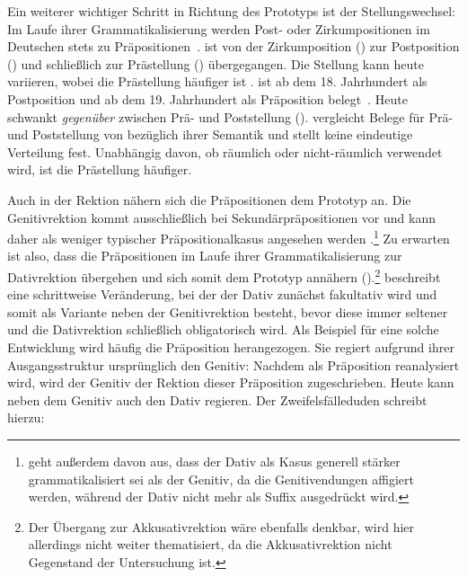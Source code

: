 Ein weiterer wichtiger Schritt in Richtung des Prototyps ist der Stellungswechsel:  
Im Laufe ihrer Grammatikalisierung werden Post- oder Zirkumpositionen im Deutschen stets zu Pr{\"a}positionen~\citep[s.][35]{Lehmann1992}. 
ist von der Zirkumposition () zur Postposition () und schließlich zur Prästellung () übergegangen. 
Die Stellung kann heute variieren, wobei die Prästellung häufiger ist \citep[s.][223]{DiMeola2011}. 
 ist ab dem 18. Jahrhundert als Postposition und ab dem 19. Jahrhundert als Pr{\"a}position belegt~\citep[35]{Lehmann1992}. 
Heute schwankt \textit{gegen{\"u}ber} zwischen Pr{\"a}- und Poststellung (\cites[s.][69--70]{DiMeola2000}[{\S}1431]{Duden2022}). 
\citet[198]{DiMeola2000} vergleicht Belege für Prä- und Poststellung von  bezüglich ihrer Semantik und stellt keine eindeutige Verteilung fest. 
Unabhängig davon, ob  räumlich oder nicht-räumlich verwendet wird, ist die Prästellung häufiger.

Auch in der Rektion nähern sich die Präpositionen dem Prototyp an. 
Die Genitivrektion kommt ausschließlich bei Sekundärpräpositionen vor und kann daher als weniger typischer Präpositionalkasus angesehen werden \citep[s.][32--34]{Lindqvist1994}.\footnote{\citet[303]{Lehmann.1985} geht außerdem davon aus, dass der Dativ als Kasus generell st{\"a}rker grammatikalisiert sei als der Genitiv, da die Genitivendungen affigiert werden, w{\"a}hrend der Dativ nicht mehr als Suffix ausgedr{\"u}ckt wird.}
Zu erwarten ist also, dass die Präpositionen im Laufe ihrer Grammatikalisierung zur Dativrektion übergehen und sich somit dem Prototyp annähern (\cites[s.][38]{Lehmann1992}[95]{Szczepaniak2011}).\footnote{Der Übergang zur Akkusativrektion wäre ebenfalls denkbar, wird hier allerdings nicht weiter thematisiert, da die Akkusativrektion nicht Gegenstand der Untersuchung ist.} 
\citet[38--39]{Lindqvist1994} beschreibt eine schrittweise Ver{\"a}nderung, bei der der Dativ zun{\"a}chst fakultativ wird und somit als Variante neben der Genitivrektion besteht, bevor diese immer seltener und die Dativrektion schlie{\ss}lich obligatorisch wird.
Als Beispiel für eine solche Entwicklung wird häufig die Präposition herangezogen. 
Sie regiert aufgrund ihrer Ausgangsstruktur ursprünglich den Genitiv: Nachdem  als Präposition reanalysiert wird, wird der Genitiv der Rektion dieser Präposition zugeschrieben. 
Heute kann  neben dem Genitiv auch den Dativ regieren. 
Der Zweifelsfälleduden schreibt hierzu: 

